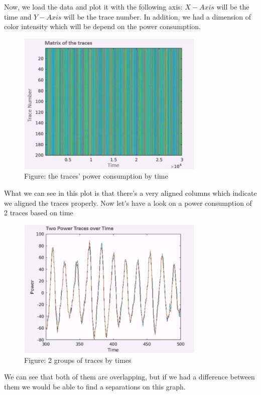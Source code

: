 Now, we load the data and plot it with the following axis: $X-Axis$ will be the time and $Y-Axis$ will be the trace number. In addition, we had a dimension of color intensity which will be depend on the power consumption.
\begin{figure}[H]
\centering
\includegraphics[width=0.8\textwidth]{images/Lecture6/traceByTime.png}
\caption{Figure: the traces' power consumption by time}
\label{fig:DPA_Illustration}
\end{figure}
What we can see in this plot is that there's a very aligned columns which indicate we aligned the traces properly.
Now let's have a look on a power consumption of 2 traces based on time
\begin{figure}[H]
\centering
\includegraphics[width=0.8\textwidth]{images/Lecture6/2traces-by-time.png}
\caption{Figure: 2 groups of traces by times}
\label{fig:DPA_Illustration}
\end{figure}
We can see that both of them are overlapping, but if we had a difference between them we would be able to find a separations on this graph.

